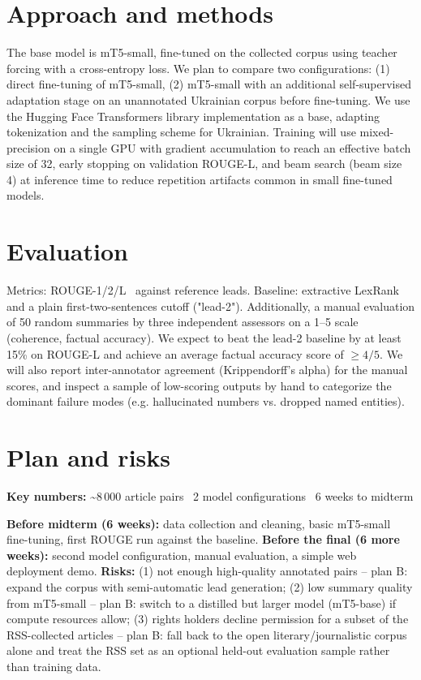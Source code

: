 \documentclass[english]{ucuproposal}
\begin{document}
\section{Approach and methods}
The base model is mT5-small, fine-tuned on the collected corpus using
teacher forcing with a cross-entropy loss. We plan to compare two
configurations: (1) direct fine-tuning of mT5-small, (2) mT5-small with
an additional self-supervised adaptation stage on an unannotated
Ukrainian corpus before fine-tuning. We use the Hugging Face Transformers
library implementation as a base, adapting tokenization and the sampling
scheme for Ukrainian. Training will use mixed-precision on a single GPU
with gradient accumulation to reach an effective batch size of 32,
early stopping on validation ROUGE-L, and beam search (beam size 4) at
inference time to reduce repetition artifacts common in small
fine-tuned models.

\section{Evaluation}
Metrics: ROUGE-1/2/L~\cite{lin2004rouge} against reference leads.
Baseline: extractive LexRank and a plain first-two-sentences cutoff
("lead-2"). Additionally, a manual evaluation of 50 random summaries by
three independent assessors on a 1--5 scale (coherence, factual
accuracy). We expect to beat the lead-2 baseline by at least 15\% on
ROUGE-L and achieve an average factual accuracy score of
\(\geq 4/5\). We will also report inter-annotator agreement (Krippendorff's
alpha) for the manual scores, and inspect a sample of low-scoring outputs
by hand to categorize the dominant failure modes (e.g. hallucinated
numbers vs. dropped named entities).

\section{Plan and risks}
\begin{keyfacts}
\textbf{Key numbers:} \textasciitilde{}8\,000 article pairs \textperiodcentered\ 2 model configurations \textperiodcentered\ 6 weeks to midterm
\end{keyfacts}
\textbf{Before midterm (6 weeks):} data collection and cleaning, basic
mT5-small fine-tuning, first ROUGE run against the baseline.
\textbf{Before the final (6 more weeks):} second model configuration,
manual evaluation, a simple web deployment demo. \textbf{Risks:}
(1) not enough high-quality annotated pairs -- plan B: expand the corpus
with semi-automatic lead generation; (2) low summary quality from
mT5-small -- plan B: switch to a distilled but larger model (mT5-base)
if compute resources allow; (3) rights holders decline permission for a
subset of the RSS-collected articles -- plan B: fall back to the open
literary/journalistic corpus alone and treat the RSS set as an optional
held-out evaluation sample rather than training data.
\end{document}
